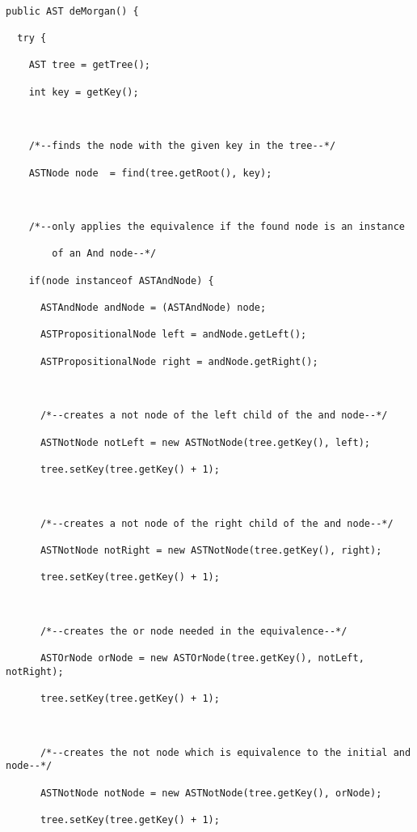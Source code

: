 \documentclass{report}
\begin{document}
\begin{lstlisting}[caption=Example of an equivalence method, label=equiveg]

public AST deMorgan() {

  try {

    AST tree = getTree();

    int key = getKey();

		

    /*--finds the node with the given key in the tree--*/

    ASTNode node  = find(tree.getRoot(), key);



    /*--only applies the equivalence if the found node is an instance

        of an And node--*/

    if(node instanceof ASTAndNode) {

      ASTAndNode andNode = (ASTAndNode) node;

      ASTPropositionalNode left = andNode.getLeft();

      ASTPropositionalNode right = andNode.getRight();



      /*--creates a not node of the left child of the and node--*/

      ASTNotNode notLeft = new ASTNotNode(tree.getKey(), left);

      tree.setKey(tree.getKey() + 1);



      /*--creates a not node of the right child of the and node--*/

      ASTNotNode notRight = new ASTNotNode(tree.getKey(), right);

      tree.setKey(tree.getKey() + 1);



      /*--creates the or node needed in the equivalence--*/

      ASTOrNode orNode = new ASTOrNode(tree.getKey(), notLeft, notRight);

      tree.setKey(tree.getKey() + 1);



      /*--creates the not node which is equivalence to the initial and node--*/

      ASTNotNode notNode = new ASTNotNode(tree.getKey(), orNode);

      tree.setKey(tree.getKey() + 1);




\end{lstlisting}
\end{document}
